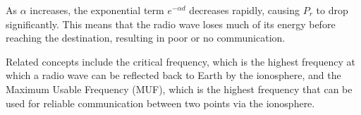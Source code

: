 As \(\alpha\) increases, the exponential term \(e^{-\alpha d}\) decreases rapidly, causing \(P_r\) to drop significantly. This means that the radio wave loses much of its energy before reaching the destination, resulting in poor or no communication.

Related concepts include the critical frequency, which is the highest frequency at which a radio wave can be reflected back to Earth by the ionosphere, and the Maximum Usable Frequency (MUF), which is the highest frequency that can be used for reliable communication between two points via the ionosphere.

